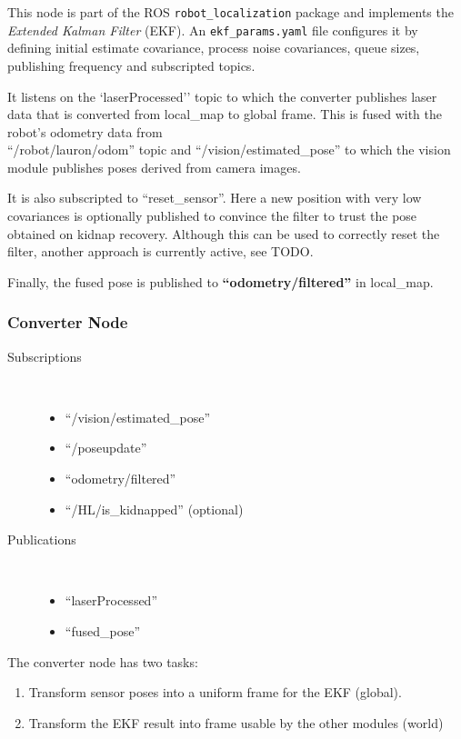 This node is part of the ROS \texttt{robot\_localization} package and implements the \textit{Extended Kalman Filter} (EKF). An \texttt{ekf\_params.yaml} file configures it by defining initial estimate covariance, process noise covariances, queue sizes, publishing frequency and subscripted topics.

It listens on the `laserProcessed'' topic to which the converter publishes laser data that is converted from local\_map to global frame. This is fused with the robot's odometry data from \\ ``/robot/lauron/odom'' topic and ``/vision/estimated\_pose'' to which the vision module publishes poses derived from camera images.

It is also subscripted to ``reset\_sensor''. Here a new position with very low covariances is optionally published to convince the filter to trust the pose obtained on kidnap recovery. Although this can be used to correctly reset the filter, another approach is currently active, see TODO.

Finally, the fused pose is published to \textbf{``odometry/filtered''} in local\_map.

\subsubsection{Converter Node}
\begin{description}
\item[Subscriptions]\
	\begin{itemize}
	\item ``/vision/estimated\_pose'' 
	\item ``/poseupdate'' 
	\item ``odometry/filtered'' 
	\item ``/HL/is\_kidnapped'' (optional)
	\end{itemize}
	
\item[Publications]\
	\begin{itemize}
	\item ``laserProcessed''
	\item ``fused\_pose''
	\end{itemize}
\end{description}

The converter node has two tasks:

\begin{enumerate}
\item Transform sensor poses into a uniform frame for the EKF (global).
\item Transform the EKF result into frame usable by the other modules (world)
\end{enumerate}

